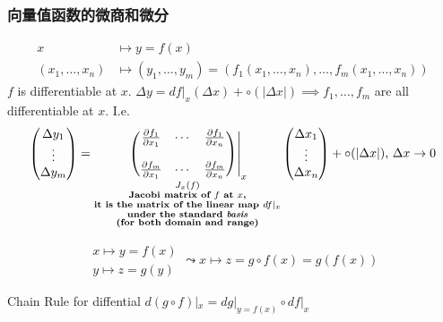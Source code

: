 \subsubsection{向量值函数的微商和微分}

\begin{align*}
    x               & \mapsto y=f(x)                                                       \\
    (x_1,\dots,x_n) & \mapsto(y_1,\dots,y_m)=(f_1(x_1,\dots,x_n),\dots,f_m(x_1,\dots,x_n))
\end{align*}
$f$ is differentiable at $x$. $\Delta y=df|_x(\Delta x)+\circ(|\Delta x|)\implies f_1,\dots,f_m$ are all differentiable at $x$. I.e.
$$
    \begin{pmatrix}
        \Delta y_1 \\
        \vdots     \\
        \Delta y_m
    \end{pmatrix}=\underset{\substack{J_x(f)\\\textbf{Jacobi matrix of $f$ at $x$,}\\\textbf{it is the matrix of the linear map $df|_x$}\\\textbf{under the standard \emph{basis}}\\\textbf{(for both domain and range)}}}{\left.\begin{pmatrix}
            \frac{\partial f_1}{\partial x_1} & \cdots & \frac{\partial f_1}{\partial x_n} \\
                                              &        &                                   \\
            \frac{\partial f_m}{\partial x_1} & \cdots & \frac{\partial f_m}{\partial x_n}
        \end{pmatrix}\right|_x}\begin{pmatrix}
        \Delta x_1 \\
        \vdots     \\
        \Delta x_n
    \end{pmatrix}+\circ(|\Delta x|)\text{, }\Delta x\to0
$$

$$
    \substack{x\mapsto y=f(x)\\y\mapsto z=g(y)}\leadsto x\mapsto z=g\circ f(x)=g(f(x))
$$

Chain Rule for diffential $d(g\circ f)|_x=dg|_{y=f(x)}\circ df|_x$

